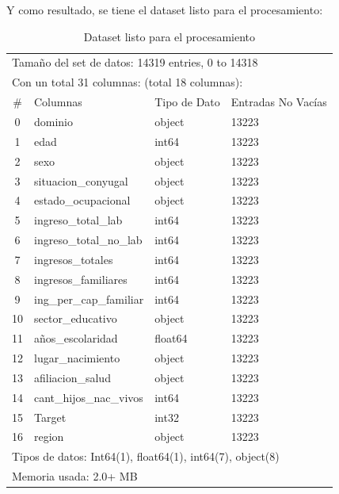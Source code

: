 \documentclass[a4paper]{article}
\begin{document}
 \vspace{1cm}
 
Y como resultado, se tiene el dataset listo para el procesamiento:

        \begin{table}[H]
            \centering
            \begin{tabular}{clll}
                \multicolumn{4}{l}{Tamaño del set de datos: 14319 entries, 0 to 14318} \\
                \multicolumn{4}{l}{Con un total 31 columnas: (total 18 columnas):} \\
                \#  & Columnas & Tipo de Dato & Entradas No Vacías \\ \hline
                0 & dominio & object & 13223 \\ 
                1 & edad & int64 & 13223 \\ 
                2 & sexo & object & 13223 \\ 
                3 & situacion\_conyugal & object & 13223 \\ 
                4 & estado\_ocupacional & object & 13223 \\ 
                5 & ingreso\_total\_lab & int64 & 13223 \\ 
                6 & ingreso\_total\_no\_lab & int64 & 13223 \\ 
                7 & ingresos\_totales & int64 & 13223 \\ 
                8 & ingresos\_familiares & int64 & 13223 \\ 
                9 & ing\_per\_cap\_familiar & int64 & 13223 \\ 
                10 & sector\_educativo & object & 13223 \\ 
                11 & años\_escolaridad & float64 & 13223 \\ 
                12 & lugar\_nacimiento & object & 13223 \\ 
                13 & afiliacion\_salud & object & 13223 \\ 
                14 & cant\_hijos\_nac\_vivos & int64 & 13223 \\ 
                15 & Target & int32 & 13223 \\ 
                16 & region & object & 13223 \\ 
                \multicolumn{4}{l}{Tipos de datos: Int64(1), float64(1), int64(7), object(8)} \\
                \multicolumn{4}{l}{Memoria usada: 2.0+ MB} 
            \end{tabular}
            \caption{Dataset listo para el procesamiento}
            \label{Final Dataset}
        \end{table}
\end{document}
